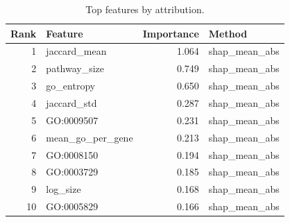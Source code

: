 \begin{table}[htbp]
\centering
\caption{Top features by attribution.}
\label{tab:top_features_recomputed}
\begin{tabular}{rlrl}
\toprule
Rank & Feature & Importance & Method \\
\midrule
1 & jaccard\_mean & 1.064 & shap\_mean\_abs \\
2 & pathway\_size & 0.749 & shap\_mean\_abs \\
3 & go\_entropy & 0.650 & shap\_mean\_abs \\
4 & jaccard\_std & 0.287 & shap\_mean\_abs \\
5 & GO:0009507 & 0.231 & shap\_mean\_abs \\
6 & mean\_go\_per\_gene & 0.213 & shap\_mean\_abs \\
7 & GO:0008150 & 0.194 & shap\_mean\_abs \\
8 & GO:0003729 & 0.185 & shap\_mean\_abs \\
9 & log\_size & 0.168 & shap\_mean\_abs \\
10 & GO:0005829 & 0.166 & shap\_mean\_abs \\
\bottomrule
\end{tabular}

\end{table}
